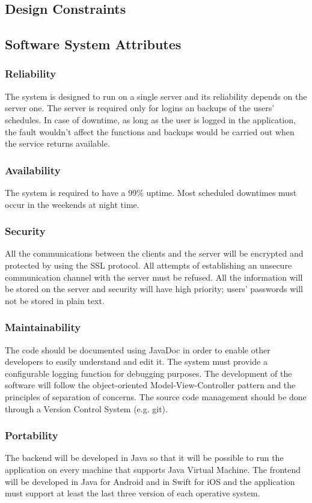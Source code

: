 \subsection{Design Constraints}

\subsection{Software System Attributes}
\subsubsection{Reliability}
The system is designed to run on a single server and its reliability depends on the server one. The server is required only for logins an backups of the users’ schedules.
In case of downtime, as long as the user is logged in the application, the fault wouldn’t affect the functions and backups would be carried out when the service returns available.

\subsubsection{Availability}
The system is required to have a 99\% uptime. Most scheduled downtimes must occur in the weekends at night time.

\subsubsection{Security}
All the communications between the clients and the server will be encrypted and protected by using the SSL protocol. All attempts of establishing an unsecure communication channel with the server must be refused.
All the information will be stored on the server and security will have high priority; users’ passwords will not be stored in plain text.

\subsubsection{Maintainability}
The code should be documented using JavaDoc in order to enable other developers to easily understand and edit it. The system must provide a configurable logging function for debugging purposes. The development of the software will follow the object-oriented Model-View-Controller pattern and the principles of separation of concerns. The source code management should be done through a Version Control System (e.g. git).

\subsubsection{Portability}
The backend will be developed in Java so that it will be possible to run the application on every machine that supports Java Virtual Machine.
The frontend will be developed in Java for Android and in Swift for iOS and the application must support at least the last three version of each operative system.



